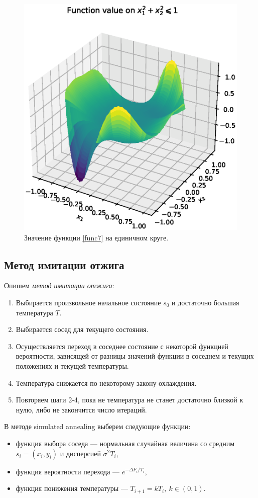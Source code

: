 \documentclass[11pt]{report}
\begin{document}
\begin{figure}[H]
    \centering
    \includegraphics[width=0.8\linewidth]{images/min-random-search.eps}
    \caption{Значение функции \ref{func7} на единичном круге.}
    \label{fig:min-random-search}
\end{figure}

\subsection{Метод имитации отжига}

Опишем \textit{метод имитации отжига}:
\begin{enumerate}
\item Выбирается произвольное начальное состояние $s_0$ и достаточно большая температура $T$.
\item Выбирается сосед для текущего состояния.
\item Осуществляется переход в соседнее состояние с некоторой функцией вероятности, зависящей от разницы значений функции в соседнем и текущих положениях и текущей температуры.
\item Температура снижается по некоторому закону охлаждения.
\item Повторяем шаги 2-4, пока не температура не станет достаточно близкой к нулю, либо не закончится число итераций.
\end{enumerate}

В методе simulated annealing выберем следующие функции:
\begin{itemize}
\item функция выбора соседа --- нормальная случайная величина со средним $s_i=(x_i,y_i)$ и дисперсией $\sigma^2 T_i$,
\item функция вероятности перехода --- $e^{-\Delta F_i/T_i}$,
\item функция понижения температуры --- $T_{i+1}=kT_i,~ k\in(0,1)$.
\end{itemize}
\end{document}
